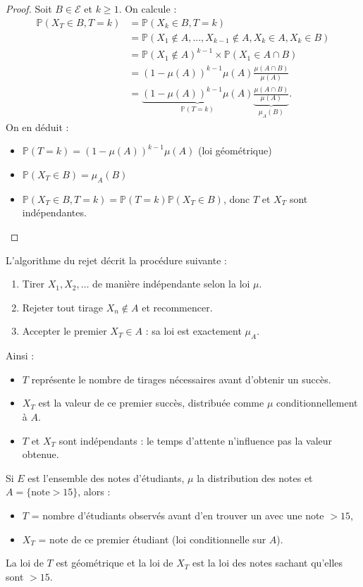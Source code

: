 \begin{proof}
    Soit $B \in \mathcal{E}$ et $k \geqslant 1$. On calcule :
    \begin{align*}
        \mathbb{P}(X_T \in B, T = k) 
        &= \mathbb{P}(X_k \in B, T = k) \\
        &= \mathbb{P}(X_1 \notin A, \dots, X_{k-1} \notin A, X_k \in A, X_k \in B) \\
        &= \mathbb{P}(X_1 \notin A)^{k-1} \times \mathbb{P}(X_1 \in A \cap B) \\
        &= (1 - \mu(A))^{k-1} \mu(A) \frac{\mu(A \cap B)}{\mu(A)} \\
        &= \underbrace{(1 - \mu(A))^{k-1} \mu(A)}_{\mathbb{P}(T = k)}
           \underbrace{\frac{\mu(A \cap B)}{\mu(A)}}_{\mu_A(B)}.
    \end{align*}
    On en déduit :
    \begin{itemize}
        \item $\mathbb{P}(T = k) = (1 - \mu(A))^{k-1} \mu(A)$ (loi géométrique)
        \item $\mathbb{P}(X_T \in B) = \mu_A(B)$
        \item $\mathbb{P}(X_T \in B, T = k) = \mathbb{P}(T = k) \mathbb{P}(X_T \in B)$, donc $T$ et $X_T$ sont indépendantes.
    \end{itemize}
\end{proof}

L'algorithme du rejet décrit la procédure suivante :
\begin{enumerate}
    \item Tirer $X_1, X_2, \dots$ de manière indépendante selon la loi $\mu$.
    \item Rejeter tout tirage $X_n \notin A$ et recommencer.
    \item Accepter le premier $X_T \in A$ : sa loi est exactement $\mu_A$.
\end{enumerate}

Ainsi :
\begin{itemize}
    \item $T$ représente le nombre de tirages nécessaires avant d'obtenir un succès.
    \item $X_T$ est la valeur de ce premier succès, distribuée comme $\mu$ conditionnellement à $A$.
    \item $T$ et $X_T$ sont indépendants : le temps d'attente n'influence pas la valeur obtenue.
\end{itemize}

\begin{example}
    Si $E$ est l'ensemble des notes d'étudiants, $\mu$ la distribution des notes et $A = \{\text{note} > 15\}$, 
    alors :
    \begin{itemize}
        \item $T$ = nombre d'étudiants observés avant d'en trouver un avec une note $> 15$,
        \item $X_T$ = note de ce premier étudiant (loi conditionnelle sur $A$).
    \end{itemize}
    La loi de $T$ est géométrique et la loi de $X_T$ est la loi des notes sachant qu'elles sont $ > 15$.
\end{example}

